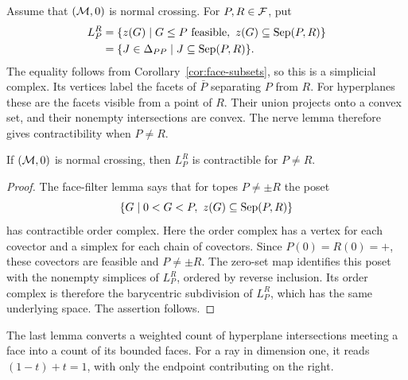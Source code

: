 Assume that $(\mathcal M,0)$ is normal crossing. For $P,R\in\mathcal F$, put
\[
 \begin{aligned}
 L_P^R&=\{z(G)\mid G\leq P\text{ feasible},\ z(G)\subseteq\Sep(P,R)\}\\
      &=\{J\in\Delta_{PP}\mid J\subseteq\Sep(P,R)\}.
 \end{aligned}
\]
The equality follows from Corollary~\ref{cor:face-subsets}, so this
is a simplicial complex.
Its vertices label the facets of $\bar P$ separating $P$ from $R$.
For hyperplanes these are the facets visible from a point of $R$.
Their union projects onto a convex set, and their nonempty
intersections are convex. The nerve lemma therefore gives
contractibility when $P\ne R$.

\begin{lemma}\label{lem:separating-facets}
If $(\mathcal M,0)$ is normal crossing, then $L_P^R$ is contractible for $P\ne R$.
\end{lemma}
\begin{proof}
The face-filter lemma \cite[Lemma 4.3.11]{OrientedMatroids1999}
says that for topes $P\ne\pm R$ the poset
\[
 \{G\mid 0<G<P,\ z(G)\subseteq\Sep(P,R)\}
\]
has contractible order complex. Here the order complex has a vertex
for each covector and a simplex for each chain of covectors.
Since $P(0)=R(0)=+$, these covectors are feasible and $P\ne\pm R$.
The zero-set map identifies this poset with the nonempty simplices of
$L_P^R$, ordered by reverse inclusion. Its order complex is therefore
the barycentric subdivision of $L_P^R$, which has the same underlying
space. The assertion follows.
\end{proof}

The last lemma converts a weighted count of hyperplane intersections
meeting a face into a count of its bounded faces. For a ray in
dimension one, it reads $(1-t)+t=1$, with only the endpoint contributing
on the right.

